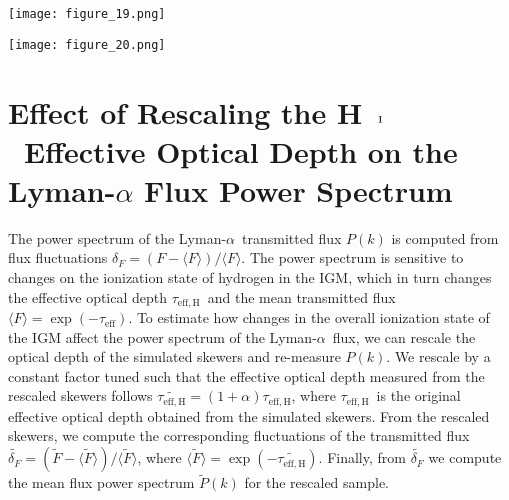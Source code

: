 \documentclass[twocolumn]{aastex62}
\newcommand\Lya{Lyman-$\alpha$}
\def\HI{\hbox{\rm H~$\scriptstyle\rm I$}}
\newcommand\taueffH{$\tau_{\mathrm{eff,H}}$~}
\begin{document}
\begin{figure*}
\texttt{[image: figure\_19.png]}
\caption{
Normalized covariance matrix of the \Lya\ transmitted flux power spectrum at $z=4.6$ measured from simulations that 
vary the parameters $\beta_{\mathrm{H}}$ (top panels) and $\Delta z_{\mathrm{H}}$ (bottom panels) independently. 
The structure of the covariance is maintained across the simulations.
Decreasing the parameter $\beta_{\mathrm{H}}$ increases the normalization of $P(k)$ and its covariance on 
roughly all scales.  We measure small elementwise differences $<0.1$ in the normalized covariance across 
simulations with different $\beta_{\mathrm{H}}$. The effect of
changing $\Delta z_{\mathrm{H}}$ is minimal with elementwise differences $<0.03$. }
\label{fig:covariance_matrix_H}
\end{figure*}



\begin{figure*}
\texttt{[image: figure\_20.png]}
\caption{
Normalized covariance matrix of the \Lya\ transmitted flux power spectrum at $z=3.0$ measured from simulations that 
vary the parameters $\beta_{\mathrm{He}}$ (top panels) and $\Delta z_{\mathrm{He}}$ (bottom panels) independently. 
The structure of the covariance is maintained across the simulations. Changes in $\beta_{\mathrm{He}}$ and $\Delta z_{\mathrm{He}}$
cause small variation in the normalized covariance matrix, we measure only small elementwise differences $<0.05$ over these simulations.   }
\label{fig:covariance_matrix_He}
\end{figure*}




\section{Effect of Rescaling the \HI\ Effective Optical Depth on the Lyman-$\alpha$ Flux Power Spectrum}
\label{sec:rescale_tau}

The power spectrum of the \Lya\ transmitted flux $P(k)$ is computed from
flux fluctuations $\delta_F = ( F - \langle F \rangle) / \langle F \rangle$.
The power spectrum is sensitive to changes on the ionization state of
hydrogen in the IGM, which in turn changes the effective optical 
depth \taueffH and the mean transmitted flux $\langle F \rangle = \exp(- \tau_\mathrm{eff}) $.
To estimate how changes in the overall ionization state of the IGM
affect the power spectrum of the \Lya\ flux, we can rescale the
optical depth of the simulated skewers and re-measure $P(k)$.
We rescale by a constant factor 
tuned such that the effective optical depth measured from the rescaled skewers follows 
$\widetilde{\tau_\mathrm{eff,H}} = ( 1 + \alpha ) \tau_\mathrm{eff,H}$, where \taueffH is the original effective optical depth obtained from the simulated skewers. 
From the rescaled skewers, we compute the corresponding fluctuations of the transmitted flux 
$\widetilde{\delta_F}  = ( \widetilde{F} - \langle \widetilde{F} \rangle) / \langle \widetilde{F} \rangle$, where 
$\langle \widetilde{F} \rangle = \exp( - \widetilde{\tau_\mathrm{eff,H}} )$.
Finally, from $\widetilde{\delta_F}$ we compute the mean flux power 
spectrum $\widetilde{P}(k)$ for the rescaled sample.
\end{document}
